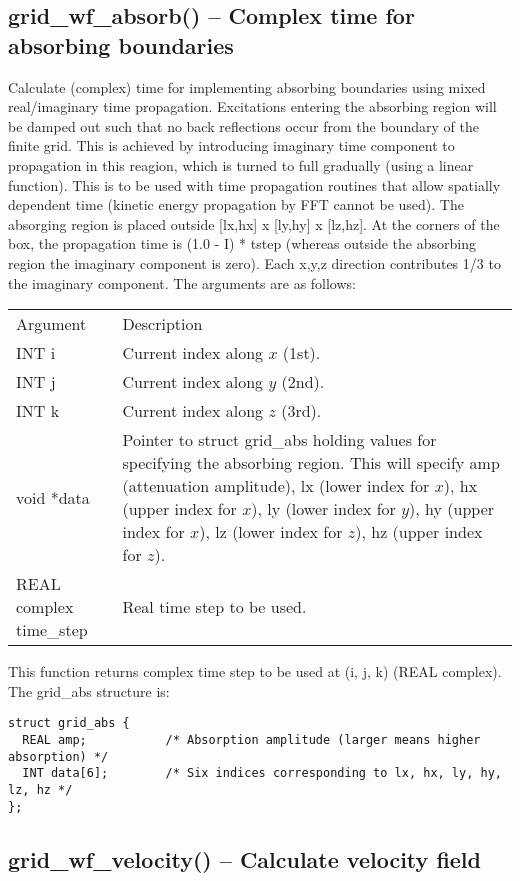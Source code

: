 \documentclass[12pt,letterpaper]{report}
\begin{document}
\subsection{grid\_wf\_absorb() -- Complex time for absorbing boundaries}

Calculate (complex) time for implementing absorbing boundaries using mixed real/imaginary time propagation. Excitations entering the absorbing region will be damped out
such that no back reflections occur from the boundary of the finite grid.
This is achieved by introducing imaginary time component to propagation
in this reagion, which is turned to full gradually (using a linear function).
This is to be used with time propagation routines that allow spatially dependent
time (kinetic energy propagation by FFT cannot be used). The absorging region is placed outside [lx,hx] x [ly,hy] x [lz,hz]. At the corners of the box, the propagation time
is (1.0 - I) * tstep (whereas outside the absorbing region the imaginary
component is zero). Each x,y,z direction contributes 1/3 to the imaginary component.
The arguments are as follows:
\begin{longtable}{p{} p{}}
Argument & Description\\
\cline{1-2}
INT i & Current index along $x$ (1st).\\                                                                                    
INT j & Current index along $y$ (2nd).\\
INT k & Current index along $z$ (3rd).\\
void *data & Pointer to struct grid\_abs holding values for specifying the absorbing region. This will specify amp (attenuation amplitude), lx (lower index for $x$), hx (upper index for $x$), ly (lower index for $y$), hy (upper index for $x$), lz (lower index for $z$), hz (upper index for $z$).\\
REAL complex time\_step & Real time step to be used.\\
\end{longtable}
\noindent
This function returns complex time step to be used at (i, j, k) (REAL complex). The grid\_abs structure is:
\begin{verbatim}
struct grid_abs {
  REAL amp;           /* Absorption amplitude (larger means higher absorption) */
  INT data[6];        /* Six indices corresponding to lx, hx, ly, hy, lz, hz */
};
\end{verbatim}

\subsection{grid\_wf\_velocity() -- Calculate velocity field}
\end{document}
